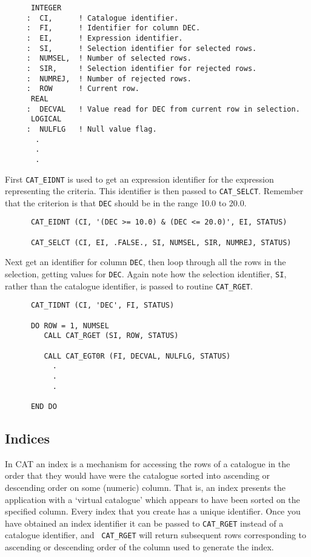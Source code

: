 \begin{verbatim}
      INTEGER
     :  CI,      ! Catalogue identifier.
     :  FI,      ! Identifier for column DEC.
     :  EI,      ! Expression identifier.
     :  SI,      ! Selection identifier for selected rows.
     :  NUMSEL,  ! Number of selected rows.
     :  SIR,     ! Selection identifier for rejected rows.
     :  NUMREJ,  ! Number of rejected rows.
     :  ROW      ! Current row.
      REAL
     :  DECVAL   ! Value read for DEC from current row in selection.
      LOGICAL
     :  NULFLG   ! Null value flag.
       .
       .
       .
\end{verbatim}

First {\tt CAT\_EIDNT} is used to get an expression identifier for the
expression representing the criteria.  This identifier is then passed
to {\tt CAT\_SELCT}. Remember that the criterion is that {\tt DEC}
should be in the range 10.0 to 20.0.

\begin{verbatim}
      CAT_EIDNT (CI, '(DEC >= 10.0) & (DEC <= 20.0)', EI, STATUS)

      CAT_SELCT (CI, EI, .FALSE., SI, NUMSEL, SIR, NUMREJ, STATUS)
\end{verbatim}

Next get an identifier for column {\tt DEC}, then loop through all the
rows in the selection, getting values for {\tt DEC}.  Again note how the
selection identifier, {\tt SI}, rather than the catalogue identifier,
is passed to routine {\tt CAT\_RGET}.

\begin{verbatim}
      CAT_TIDNT (CI, 'DEC', FI, STATUS)

      DO ROW = 1, NUMSEL
         CALL CAT_RGET (SI, ROW, STATUS)

         CALL CAT_EGT0R (FI, DECVAL, NULFLG, STATUS)
           .
           .
           .

      END DO
\end{verbatim}


\subsection{Indices}

In CAT an index is a mechanism for accessing the rows of a catalogue in
the order that they would have were the catalogue sorted into ascending
or descending order on some (numeric) column. That is, an index presents
the application with a `virtual catalogue' which appears to have been
sorted on the specified column. Every index that you create has a unique
identifier. Once you have obtained an index identifier it can be passed to
{\tt CAT\_RGET} instead of a catalogue identifier, and {\tt
CAT\_RGET} will return subsequent rows corresponding to ascending or
descending order of the column used to generate the index.

